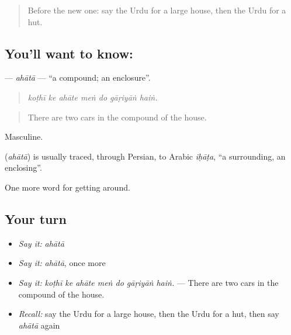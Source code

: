 \label{lesson:UR-C413-ahata}



\begin{quote}
Before the new one: say the Urdu for a large house, then the Urdu for a hut.
\end{quote}

\subsection*{You'll want to know: }
\textbf{} — \emph{ahātā} — \textquotedblleft{}a compound; an enclosure\textquotedblright{}.

\begin{quote}
      
\end{quote}

\begin{quote}
\emph{koṭhī ke ahāte meṅ do gāṛiyāṅ haiṅ.}
\end{quote}

\begin{quote}
There are two cars in the compound of the house.
\end{quote}

Masculine.

\begin{cousinweb}
\textbf{} (\emph{ahātā}) is usually traced, through Persian, to Arabic \emph{iḥāṭa}, \textquotedblleft{}a surrounding, an enclosing\textquotedblright{}.
\end{cousinweb}

\begin{grammarlens}[title={What you've built}]
One more word for getting around.
\end{grammarlens}

\subsection*{Your turn}
\begin{itemize}
\raggedright
  \item \emph{Say it:} \emph{ahātā}
  \item \emph{Say it:} \emph{ahātā}, once more
  \item \emph{Say it:} \emph{koṭhī ke ahāte meṅ do gāṛiyāṅ haiṅ.} — There are two cars in the compound of the house.
  \item \emph{Recall:} say the Urdu for a large house, then the Urdu for a hut, then say \emph{ahātā} again
\end{itemize}

